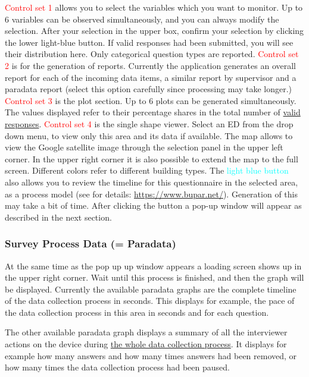 \documentclass[a4paper]{article}
\begin{document}
\textcolor{red}{Control set 1} allows you to select the variables which you want to monitor. Up to 6 variables can be observed simultaneously, and you can always modify the selection. After your selection in the upper box, confirm your selection by clicking the lower light-blue button. If valid responses had been submitted, you will see their distribution here. Only categorical question types are reported.\newline
\textcolor{red}{Control set 2} is for the generation of reports. Currently the application generates an overall report for each of the incoming data items, a similar report by supervisor and a paradata report (select this option carefully since processing may take longer.) \newline
\textcolor{red}{Control set 3} is the plot section. Up to 6 plots can be generated simultaneously. The values displayed refer to their percentage shares in the total number of \underline{valid responses}.\newline
\textcolor{red}{Control set 4} is the single shape viewer. Select an ED from the drop down menu, to view only this area and its data if available. The map allows to view the Google satellite image through the selection panel in the upper left corner. In the upper right corner it is also possible to extend the map to the full screen. Different colors refer to different building types. The \textcolor{cyan}{light blue button} also allows you to review the timeline for this questionnaire in the selected area, as a process model (see for details: \url{https://www.bupar.net/}). Generation of this may take a bit of time. After clicking the button a pop-up window will appear as described in the next section.

\hypertarget{survey-process-data-paradata}{%
\subsubsection{Survey Process Data (= Paradata)}\label{survey-process-data-paradata}}

At the same time as the pop up up window appears a loading screen shows up in the upper right corner. Wait until this process is finished, and then the graph will be displayed.
Currently the available paradata graphs are the complete timeline of the data collection process in seconds. This displays for example, the pace of the data collection process in this area in seconds and for each question.

The other available paradata graph displays a summary of all the interviewer actions on the device during \underline{the whole data collection process}. It displays for example how many answers and how many times answers had been removed, or how many times the data collection process had been paused.
\end{document}
